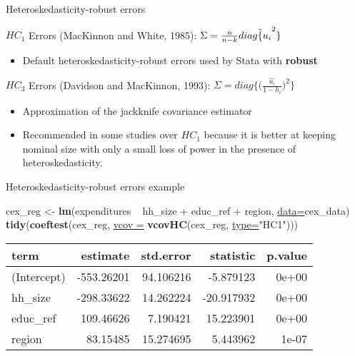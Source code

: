 \documentclass[ignorenonframetext,]{beamer}
\newenvironment{Shaded}{\begin{snugshade}}{\end{snugshade}}
\newcommand{\KeywordTok}[1]{\textcolor[rgb]{0.26,0.66,0.93}{\textbf{#1}}}
\newcommand{\DataTypeTok}[1]{\textcolor[rgb]{0.74,0.68,0.62}{\underline{#1}}}
\newcommand{\StringTok}[1]{\textcolor[rgb]{0.02,0.61,0.04}{#1}}
\newcommand{\OperatorTok}[1]{\textcolor[rgb]{0.74,0.68,0.62}{#1}}
\newcommand{\NormalTok}[1]{\textcolor[rgb]{0.74,0.68,0.62}{#1}}
\providecommand{\tightlist}{%
  \setlength{\itemsep}{0pt}\setlength{\parskip}{0pt}}
\begin{document}
\begin{frame}{Heteroskedasticity-robust errors}

\(HC_1\) Errors (MacKinnon and White, 1985):
\(\Sigma = \frac{n}{n-k}diag{\hat\{u_i}^2\}\)

\begin{itemize}
\tightlist
\item
  Default heteroskedasticity-robust errors used by Stata with
  \textbf{robust}
\end{itemize}

\(HC_3\) Errors (Davidson and MacKinnon, 1993):
\(\Sigma = diag \{ \big( \frac{\hat{u_i}}{1-h_i} \big)^2 \}\)

\begin{itemize}
\item
  Approximation of the jackknife covariance estimator
\item
  Recommended in some studies over \(HC_1\) because it is better at
  keeping nominal size with only a small loss of power in the presence
  of heteroskedasticity.
\end{itemize}

\end{frame}

\begin{frame}[fragile]{Heteroskedasticity-robust errors example}

\begin{Shaded}
\begin{Highlighting}[]
\NormalTok{cex_reg <-}\StringTok{ }\KeywordTok{lm}\NormalTok{(expenditures }\OperatorTok{~}\StringTok{ }\NormalTok{hh_size }\OperatorTok{+}\StringTok{ }\NormalTok{educ_ref }\OperatorTok{+}\StringTok{ }
\StringTok{                }\NormalTok{region, }\DataTypeTok{data=}\NormalTok{cex_data)}
\KeywordTok{tidy}\NormalTok{(}\KeywordTok{coeftest}\NormalTok{(cex_reg, }\DataTypeTok{vcov =} 
                \KeywordTok{vcovHC}\NormalTok{(cex_reg, }\DataTypeTok{type=}\StringTok{"HC1"}\NormalTok{)))}
\end{Highlighting}
\end{Shaded}

\begin{longtable}[]{@{}lrrrr@{}}
\toprule
term & estimate & std.error & statistic & p.value\tabularnewline
\midrule
\endhead
(Intercept) & -553.26201 & 94.106216 & -5.879123 & 0e+00\tabularnewline
hh\_size & -298.33622 & 14.262224 & -20.917932 & 0e+00\tabularnewline
educ\_ref & 109.46626 & 7.190421 & 15.223901 & 0e+00\tabularnewline
region & 83.15485 & 15.274695 & 5.443962 & 1e-07\tabularnewline
\bottomrule
\end{longtable}

\end{frame}
\end{document}
